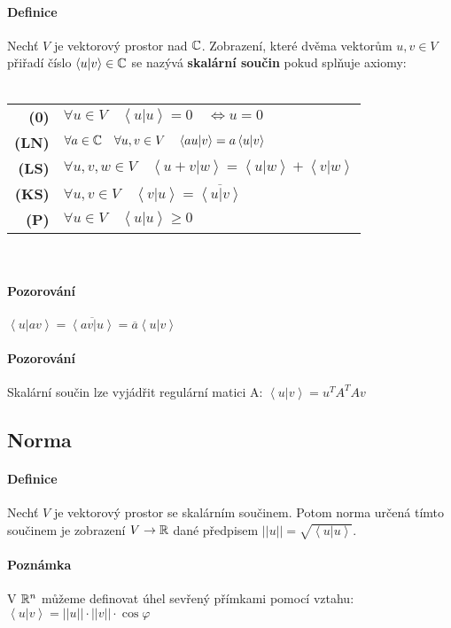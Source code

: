 \documentclass[a4paper,10pt]{article}
\begin{document}
\paragraph{Definice}
Nechť $V$ je vektorový prostor nad $\mathbb{C}$. Zobrazení, které dvěma vektorům $u, v
\in V$ přiřadí číslo $\left<u|v\right> \in \mathbb{C}$ se nazývá \textbf{skalární součin} pokud splňuje
axiomy: \\\ \\
\begin{tabular}{rl}
	\textbf{(0)} & $\forall u \in V \quad \left<u|u\right> = 0 \quad \Leftrightarrow u = 0$ \\
	\textbf{(LN)} & $\forall a \in \mathbb{C} \quad \forall u,v \in V \quad \left<au|v\right> = a\left<u|v\right>$ \\
	\textbf{(LS)} & $\forall u,v,w \in V \quad \left<u+v|w\right> = \left<u|w\right> + \left<v|w\right>$ \\
	\textbf{(KS)} & $\forall u,v \in V \quad \left<v|u\right> = \overline{\left<u|v\right>}$ \\
	\textbf{(P)} & $\forall u \in V \quad \left<u|u\right> \ge 0$
\end{tabular}
\ \\
\paragraph{Pozorování}
$\left<u|av\right> = \overline{\left<av|u\right>} = \overline{a}\left<u|v\right>$
\paragraph{Pozorování}
Skalární součin lze vyjádřit regulární matici A: $\left<u|v\right> = u^T A^T A v$

\subsection{Norma}
\setcounter{equation}{0}
\paragraph{Definice}
Nechť $V$ je vektorový prostor se skalárním součinem. Potom norma určená tímto
součinem je zobrazení $V \to \mathbb{R}$ dané předpisem $||u|| = \sqrt{\left<u|u\right>}$.
\paragraph{Poznámka}
V $\mathbb{R}^n$ můžeme definovat úhel sevřený přímkami pomocí vztahu: $\left<u|v\right> = ||u||
\cdot ||v|| \cdot \cos \varphi$
\end{document}
